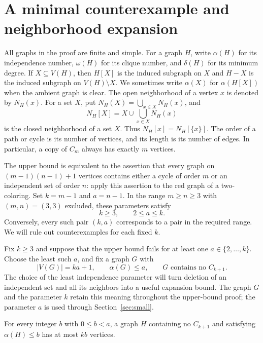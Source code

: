 \section{A minimal counterexample and neighborhood expansion}
\label{sec:reduction}

All graphs in the proof are finite and simple. For a graph $H$, write
$\alpha(H)$ for its independence number, $\omega(H)$ for its clique
number, and $\delta(H)$ for its minimum degree. If $X\subseteq V(H)$,
then $H[X]$ is the induced subgraph on $X$ and $H-X$ is the induced
subgraph on $V(H)\setminus X$. We sometimes write $\alpha(X)$ for
$\alpha(H[X])$ when the ambient graph is clear. The open neighborhood
of a vertex $x$ is denoted by $N_H(x)$. For a set $X$, put
$N_H(X)=\bigcup_{x\in X}N_H(x)$, and
\[
  N_H[X]=X\cup\bigcup_{x\in X}N_H(x)
\]
is the closed neighborhood of a set $X$. Thus $N_H[x]=N_H[\{x\}]$.
The order of a path or cycle is its number of vertices, and its length
is its number of edges. In particular, a copy of $C_m$ always has
exactly $m$ vertices.

The upper bound is equivalent to the assertion that every graph on
$(m-1)(n-1)+1$ vertices contains either a cycle of order $m$ or an
independent set of order $n$: apply this assertion to the red graph of
a two-coloring. Set $k=m-1$ and $a=n-1$. In the range $m\ge n\ge3$
with $(m,n)=(3,3)$ excluded, these parameters satisfy
\[
  k\ge3,\qquad 2\le a\le k.
\]
Conversely, every such pair $(k,a)$ corresponds to a pair in the
required range. We will rule out counterexamples for each fixed $k$.

Fix $k\ge3$ and suppose that the upper bound fails for at least one
$a\in\{2,\ldots,k\}$. Choose the least such $a$, and fix a graph $G$
with
\begin{equation}
  |V(G)|=ka+1,\qquad \alpha(G)\le a,
  \qquad G\text{ contains no }C_{k+1}.
  \label{red:counterexample}
\end{equation}
The choice of the least independence parameter will turn deletion of
an independent set and all its neighbors into a useful expansion
bound. The graph $G$ and the parameter $k$ retain this meaning throughout
the upper-bound proof; the parameter $a$ is used through
Section~\ref{sec:small}.

\begin{lemma}\label{red:smaller}
For every integer $b$ with $0\le b<a$, a graph $H$ containing no
$C_{k+1}$ and satisfying $\alpha(H)\le b$ has at most $kb$ vertices.
\end{lemma}

